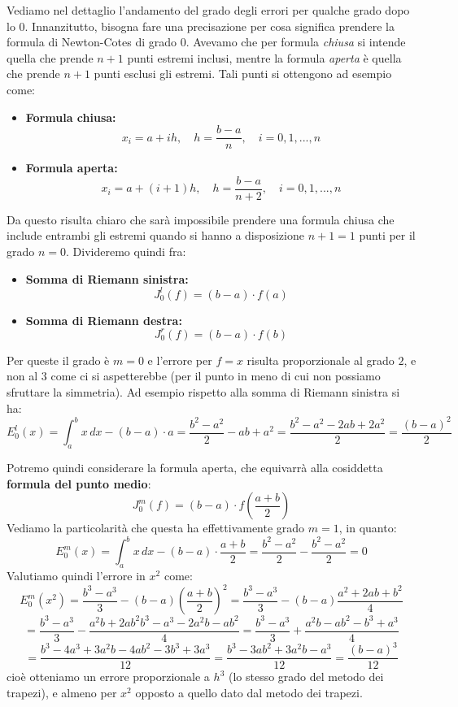 \documentclass[a4paper,11pt]{article}
\begin{document}
\par\smallskip

Vediamo nel dettaglio l'andamento del grado degli errori per qualche grado dopo lo 0.
Innanzitutto, bisogna fare una precisazione per cosa significa prendere la formula di Newton-Cotes di grado 0.
Avevamo che per formula \textit{chiusa} si intende quella che prende $n + 1$ punti estremi inclusi, mentre la formula \textit{aperta} è quella che prende $n + 1$ punti esclusi gli estremi.
Tali punti si ottengono ad esempio come:
\begin{itemize}
	\item \textbf{Formula chiusa:}
		$$
			x_i = a + i h, \quad h = \frac{b - a}{n}, \quad i = 0, 1, ..., n
		$$
	\item \textbf{Formula aperta:}
		$$
			x_i = a + (i + 1) h, \quad h = \frac{b - a}{n + 2}, \quad i = 0, 1, ..., n
		$$
\end{itemize}

Da questo risulta chiaro che sarà impossibile prendere una formula chiusa che include entrambi gli estremi quando si hanno a disposizione $n + 1 = 1$ punti per il grado $n = 0$.
Divideremo quindi fra:
\begin{itemize}
	\item \textbf{Somma di Riemann sinistra:}
		$$
			J_0^l (f) = (b - a) \cdot f(a)
		$$
	\item \textbf{Somma di Riemann destra:}
		$$
			J_0^r (f) = (b - a) \cdot f(b)
		$$
\end{itemize}

Per queste il grado è $m = 0$ e l'errore per $f = x$ risulta proporzionale al grado $2$, e non al $3$ come ci si aspetterebbe (per il punto in meno di cui non possiamo sfruttare la simmetria).
Ad esempio rispetto alla somma di Riemann sinistra si ha:
$$
E_0^l (x) = \int_a^b x \, dx - (b - a) \cdot a = \frac{b^2 - a^2}{2} - ab + a^2 = \frac{b^2 - a^2 - 2ab + 2a^2}{2} = \frac{(b - a)^2}{2}
$$

Potremo quindi considerare la formula aperta, che equivarrà alla cosiddetta \textbf{formula del punto medio}:
$$
J_0^m(f) = (b - a) \cdot f \left( \frac{a + b}{2} \right)
$$
Vediamo la particolarità che questa ha effettivamente grado $m = 1$, in quanto:
$$
E_0^m (x) = \int_a^b x \, dx - (b - a) \cdot \frac{a + b}{2} = \frac{b^2 - a^2}{2} - \frac{b^2 - a^2}{2} = 0
$$
Valutiamo quindi l'errore in $x^2$ come:
$$
E_0^m (x^2) = \frac{b^3 - a^3}{3} - (b - a) \left( \frac{a + b}{2} \right)^2 = \frac{b^3 - a^3}{3} - (b - a) \frac{a^2 + 2ab + b^2}{4}
$$
$$
= \frac{b^3 - a^3}{3} - \frac{a^2 b + 2 a b^2 b^3 - a^3 - 2 a^2 b - ab^2}{4} = \frac{b^3 - a^3}{3} + \frac{a^2 b - ab^2 - b^3 + a^3}{4}
$$
$$
= \frac{b^3 - 4a^3 + 3 a^2 b - 4 a b^2 - 3 b^3 + 3 a^3}{12} = \frac{b^3 - 3 a b^2 + 3 a^2 b - a^3}{12} = \frac{(b - a)^3}{12}
$$
cioè otteniamo un errore proporzionale a $h^3$ (lo stesso grado del metodo dei trapezi), e almeno per $x^2$ opposto a quello dato dal metodo dei trapezi.
\end{document}
